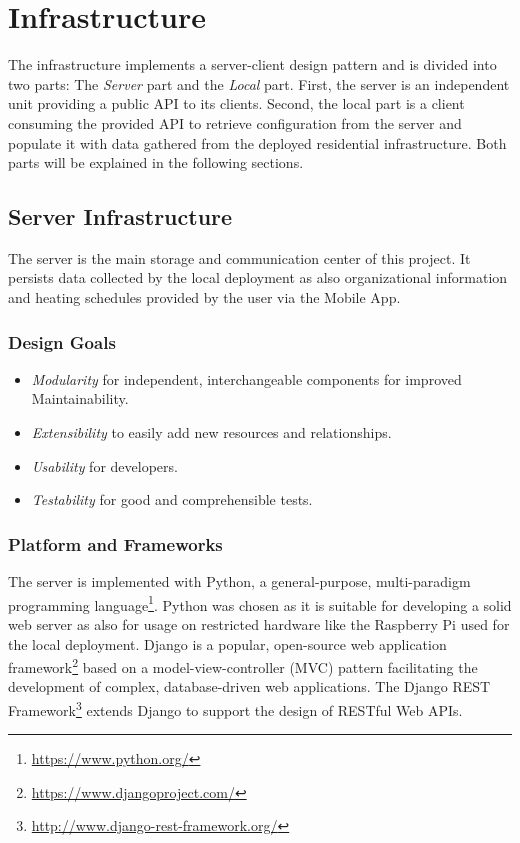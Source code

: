 
\chapter{Infrastructure}
\label{sec:infrastructure}

The infrastructure implements a server-client design pattern and is divided into two parts:
The \emph{Server} part and the \emph{Local} part.
First, the server is an independent unit providing a public API to its clients.
Second, the local part is a client consuming the provided API to retrieve configuration from the server and populate it with data gathered from the deployed residential infrastructure.
Both parts will be explained in the following sections.

\section{Server Infrastructure}
\label{sec:server_infrastructure}

The server is the main storage and communication center of this project.
It persists data collected by the local deployment as also organizational information and heating schedules provided by the user via the Mobile App.

\subsection{Design Goals}

\begin{itemize}
\item \emph{Modularity} for independent, interchangeable components for improved Maintainability.
\item \emph{Extensibility} to easily add new resources and relationships.
\item \emph{Usability} for developers.
\item \emph{Testability} for good and comprehensible tests.
\end{itemize}

\subsection{Platform and Frameworks}

The server is implemented with Python, a general-purpose, multi-paradigm programming language\footnote{\url{https://www.python.org/}}.
Python was chosen as it is suitable for developing a solid web server as also for usage on restricted hardware like the Raspberry Pi used for the local deployment.
Django is a popular, open-source web application framework\footnote{\url{https://www.djangoproject.com/}} based on a model-view-controller (MVC) pattern facilitating the development of complex, database-driven web applications.
The Django REST Framework\footnote{\url{http://www.django-rest-framework.org/}} extends Django to support the design of RESTful Web APIs.

